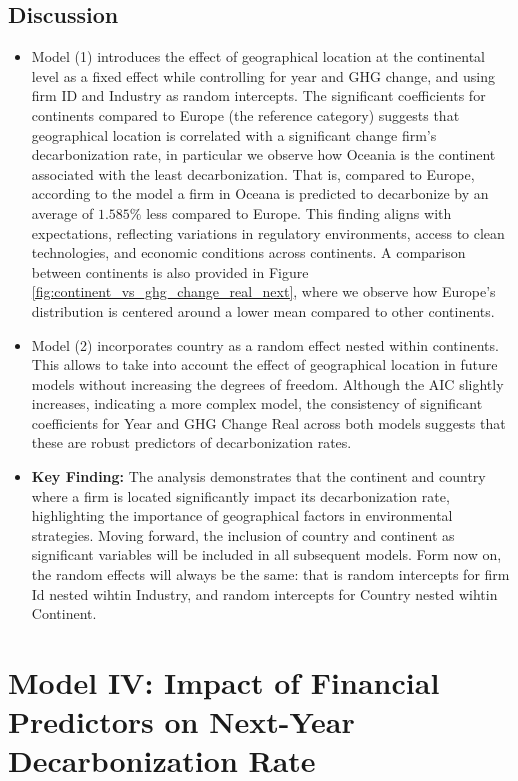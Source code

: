 \subsection{Discussion}
\begin{itemize}
    \item Model (1) introduces the effect of geographical location at the continental level as a fixed effect while controlling for year and GHG change, and using firm ID and Industry as random intercepts. The significant coefficients for continents compared to Europe (the reference category) suggests that geographical location is correlated with a significant change firm's decarbonization rate, in particular we observe how Oceania is the continent associated with the least decarbonization. That is, compared to Europe, according to the model a firm in Oceana is predicted to decarbonize by an average of $1.585 \%$ less compared to Europe. This finding aligns with expectations, reflecting variations in regulatory environments, access to clean technologies, and economic conditions across continents. A comparison between continents is also provided in Figure \ref{fig:continent_vs_ghg_change_real_next}, where we observe how Europe's distribution is centered around a lower mean compared to other continents. 
    \item Model (2) incorporates country as a random effect nested within continents. This allows to take into account the effect of geographical location in future models without increasing the degrees of freedom. Although the AIC slightly increases, indicating a more complex model, the consistency of significant coefficients for Year and GHG Change Real across both models suggests that these are robust predictors of decarbonization rates.
    \item \textbf{Key Finding:} The analysis demonstrates that the continent and country where a firm is located significantly impact its decarbonization rate, highlighting the importance of geographical factors in environmental strategies. Moving forward, the inclusion of country and continent as significant variables will be included in all subsequent models. Form now on, the random effects will always be the same: that is random intercepts for firm Id nested wihtin Industry, and random intercepts for Country nested wihtin Continent. 
\end{itemize}

 

\section{Model IV: Impact of Financial Predictors on Next-Year Decarbonization Rate}

